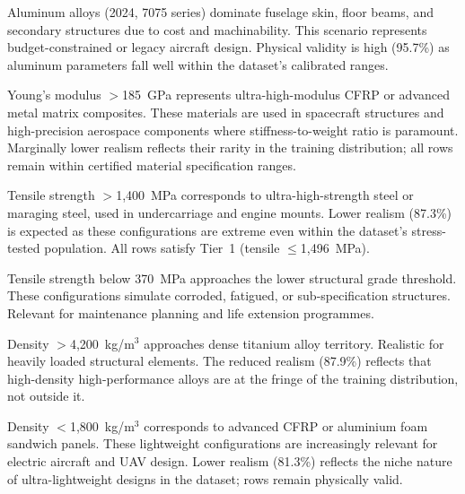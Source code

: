\documentclass[12pt,a4paper]{article}
\begin{document}
\begin{tcolorbox}[rulebox, title={Material: Aluminum Only (Realism 95.7\%)}]
Aluminum alloys (2024, 7075 series) dominate fuselage skin, floor beams, and secondary structures due to cost and machinability. This scenario represents budget-constrained or legacy aircraft design. Physical validity is high (95.7\%) as aluminum parameters fall well within the dataset's calibrated ranges.
\end{tcolorbox}

\begin{tcolorbox}[rulebox, title={Modulus Extreme High (Realism 92.7\%)}]
Young's modulus $>$185~GPa represents ultra-high-modulus CFRP or advanced metal matrix composites. These materials are used in spacecraft structures and high-precision aerospace components where stiffness-to-weight ratio is paramount. Marginally lower realism reflects their rarity in the training distribution; all rows remain within certified material specification ranges.
\end{tcolorbox}

\begin{tcolorbox}[rulebox, title={Tensile Extreme High (Realism 87.3\%)}]
Tensile strength $>$1{,}400~MPa corresponds to ultra-high-strength steel or maraging steel, used in undercarriage and engine mounts. Lower realism (87.3\%) is expected as these configurations are extreme even within the dataset's stress-tested population. All rows satisfy Tier~1 (tensile $\leq$1{,}496~MPa).
\end{tcolorbox}

\begin{tcolorbox}[rulebox, title={Tensile Extreme Low (Realism 92.7\%)}]
Tensile strength below 370~MPa approaches the lower structural grade threshold. These configurations simulate corroded, fatigued, or sub-specification structures. Relevant for maintenance planning and life extension programmes.
\end{tcolorbox}

\begin{tcolorbox}[rulebox, title={Density Extreme Heavy (Realism 87.9\%)}]
Density $>$4{,}200~kg/m$^3$ approaches dense titanium alloy territory. Realistic for heavily loaded structural elements. The reduced realism (87.9\%) reflects that high-density high-performance alloys are at the fringe of the training distribution, not outside it.
\end{tcolorbox}

\begin{tcolorbox}[rulebox, title={Density Extreme Light (Realism 81.3\%)}]
Density $<$1{,}800~kg/m$^3$ corresponds to advanced CFRP or aluminium foam sandwich panels. These lightweight configurations are increasingly relevant for electric aircraft and UAV design. Lower realism (81.3\%) reflects the niche nature of ultra-lightweight designs in the dataset; rows remain physically valid.
\end{tcolorbox}
\end{document}
